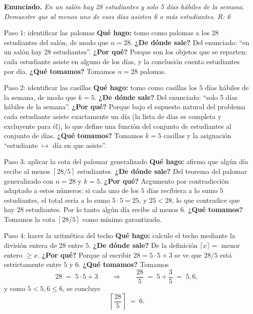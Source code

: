 \documentclass[11pt]{article}
\begin{document}
\textbf{Enunciado.} \emph{En un sal\'on hay 28 estudiantes y solo 5 d\'ias h\'abiles de la semana. Demuestre que al menos uno de esos d\'ias asisten 6 o m\'as estudiantes. R: 6}

\begin{sol}

\begin{paso}{Paso 1: identificar las palomas}
\textbf{Qu\'e hago:} tomo como palomas a los $28$ estudiantes del sal\'on, de modo que $n=28$.
\textbf{¿De d\'onde sale?} Del enunciado: ``en un sal\'on hay 28 estudiantes''.
\textbf{¿Por qu\'e?} Porque son los objetos que se reparten: cada estudiante asiste en alguno de los d\'ias, y la conclusi\'on cuenta estudiantes por d\'ia.
\textbf{¿Qu\'e tomamos?} Tomamos $n=28$ palomas.
\end{paso}

\begin{paso}{Paso 2: identificar las casillas}
\textbf{Qu\'e hago:} tomo como casillas los $5$ d\'ias h\'abiles de la semana, de modo que $k=5$.
\textbf{¿De d\'onde sale?} Del enunciado: ``solo 5 d\'ias h\'abiles de la semana''.
\textbf{¿Por qu\'e?} Porque bajo el supuesto natural del problema cada estudiante asiste exactamente un d\'ia (la lista de d\'ias es completa y excluyente para \'el), lo que define una funci\'on del conjunto de estudiantes al conjunto de d\'ias.
\textbf{¿Qu\'e tomamos?} Tomamos $k=5$ casillas y la asignaci\'on ``estudiante $\mapsto$ d\'ia en que asiste''.
\end{paso}

\begin{paso}{Paso 3: aplicar la cota del palomar generalizado}
\textbf{Qu\'e hago:} afirmo que alg\'un d\'ia recibe al menos $\left\lceil 28/5\right\rceil$ estudiantes.
\textbf{¿De d\'onde sale?} Del teorema del palomar generalizado con $n=28$ y $k=5$.
\textbf{¿Por qu\'e?} Argumento por contradicci\'on adaptado a estos n\'umeros: si cada uno de los $5$ d\'ias recibiera a lo sumo $5$ estudiantes, el total ser\'ia a lo sumo $5\cdot 5 = 25$, y $25<28$, lo que contradice que hay $28$ estudiantes. Por lo tanto alg\'un d\'ia recibe al menos $6$.
\textbf{¿Qu\'e tomamos?} Tomamos la cota $\left\lceil 28/5\right\rceil$ como m\'inimo garantizado.
\end{paso}

\begin{paso}{Paso 4: hacer la aritm\'etica del techo}
\textbf{Qu\'e hago:} calculo el techo mediante la divisi\'on entera de $28$ entre $5$.
\textbf{¿De d\'onde sale?} De la definici\'on $\lceil x\rceil = $ menor entero $\ge x$.
\textbf{¿Por qu\'e?} Porque al escribir $28=5\cdot 5+3$ se ve que $28/5$ est\'a estrictamente entre $5$ y $6$.
\textbf{¿Qu\'e tomamos?} Tomamos
\[
28 \;=\; 5\cdot 5 + 3
\qquad\Longrightarrow\qquad
\frac{28}{5} \;=\; 5 + \frac{3}{5} \;=\; 5{,}6 ,
\]
y como $5 < 5{,}6 \le 6$, se concluye
\[
\left\lceil \frac{28}{5} \right\rceil \;=\; 6 .
\]
\end{paso}


\end{sol}
\end{document}
